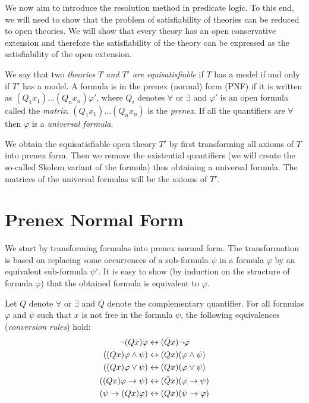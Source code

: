 We now aim to introduce the resolution method in predicate logic. To this end, we will need to show that the problem of satisfiability of theories can be reduced to open theories. We will show that every theory has an open conservative extension and therefore the satisfiability of the theory can be expressed as the satisfiability of the open extension. 

We say that two \emph{theories $T$ and $T'$ are equisatisfiable} if $T$ has a model if and only if $T'$ has a model. A formula is in the prenex (normal) form (PNF) if it is written as $(Q_1 x_1)\dots(Q_n x_n)\varphi'$, where $Q_i$ denotes $\forall$ or $\exists$ and $\varphi'$ is an open formula called the \emph{matrix}. $(Q_1 x_1)\dots(Q_n x_n)$ is the \emph{prenex}. If all the quantifiers are $\forall$ then $\varphi$ is a \emph{universal formula}.

We obtain the equisatisfiable open theory $T'$ by first transforming all axioms of $T$ into prenex form. Then we remove the existential quantifiers (we will create the so-called Skolem variant of the formula) thus obtaining a universal formula. The matrices of the universal formulas will be the axioms of $T'$.

\section{Prenex Normal Form}

We start by transforming formulas into prenex normal form. The transformation is based on replacing some occurrences of a sub-formula $\psi$ in a formula $\varphi$ by an equivalent sub-formula $\psi'$. It is easy to show (by induction on the structure of formula $\varphi$) that the obtained formula is equivalent to $\varphi$.

Let $Q$ denote $\forall$ or $\exists$ and $\bar{Q}$ denote the complementary quantifier. For all formulas $\varphi$ and $\psi$ such that $x$ is not free in the formula $\psi$, the following equivalences (\emph{conversion rules}) hold:
\begin{align*}
\neg(Qx)\varphi & \leftrightarrow (\bar{Q}x)\neg \varphi \\
((Qx)\varphi \land \psi) & \leftrightarrow (Qx)(\varphi \land \psi) \\
((Qx)\varphi \lor \psi) & \leftrightarrow (Qx)(\varphi \lor \psi) \\
((Qx)\varphi \to \psi) & \leftrightarrow (\bar{Q}x)(\varphi \to \psi) \\
(\psi \to (Qx) \varphi) & \leftrightarrow (Qx)(\psi \to \varphi)
\end{align*}

